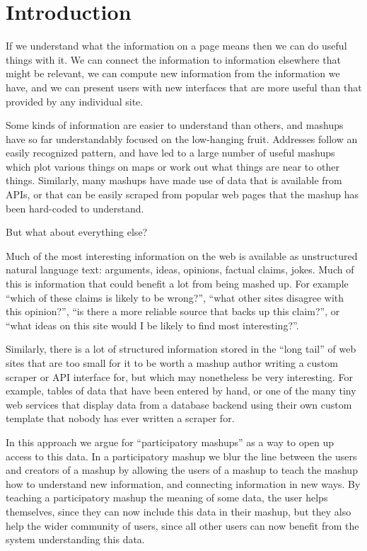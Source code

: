 \documentclass{chi2009}
\begin{document}
\section{Introduction}

If we understand what the information on a page means then we can do useful things with it. We can connect the information to information elsewhere that might be relevant, we can compute new information from the information we have, and we can present users with new interfaces that are more useful than that provided by any individual site. 

Some kinds of information are easier to understand than others, and mashups have so far understandably focused on the low-hanging fruit. Addresses follow an easily recognized pattern, and have led to a large number of useful mashups which plot various things on maps or work out what things are near to other things. Similarly, many mashups have made use of data that is available from APIs, or that can be easily scraped from popular web pages that the mashup has been hard-coded to understand.

But what about everything else? 

Much of the most interesting information on the web is available as unstructured natural language text: arguments, ideas, opinions, factual claims, jokes. Much of this is information that could benefit a lot from being mashed up. For example ``which of these claims is likely to be wrong?'', ``what other sites disagree with this opinion?'', ``is there a more reliable source that backs up this claim?'', or ``what ideas on this site would I be likely to find most interesting?''.

Similarly, there is a lot of structured information stored in the ``long tail'' of web sites that are too small for it to be worth a mashup author writing a custom scraper or API interface for, but which may nonetheless be very interesting. For example, tables of data that have been entered by hand, or one of the many tiny web services that display data from a database backend using their own custom template that nobody has ever written a scraper for.

In this approach we argue for ``participatory mashups'' as a way to open up access to this data. In a participatory mashup we blur the line between the users and creators of a mashup by allowing the users of a mashup to teach the mashup how to understand new information, and connecting information in new ways. By teaching a participatory mashup the meaning of some data, the user helps themselves, since they can now include this data in their mashup, but they also help the wider community of users, since all other users can now benefit from the system understanding this data.
\end{document}
